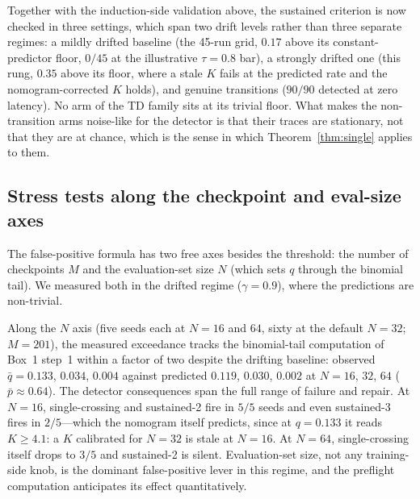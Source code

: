 \documentclass[11pt]{article}
\theoremstyle{plain}
\theoremstyle{definition}
\begin{document}
Together with the induction-side validation above, the sustained criterion is now checked
in three settings, which span two drift levels rather than three separate regimes: a
mildly drifted baseline (the 45-run grid, $0.17$ above its constant-predictor floor,
$0/45$ at the illustrative $\tau=0.8$ bar), a strongly drifted one (this rung, $0.35$
above its floor, where a stale $K$ fails at the predicted rate and the
nomogram-corrected $K$ holds), and genuine transitions ($90/90$ detected at zero
latency). No arm of the TD family sits at its trivial floor. What makes the
non-transition arms noise-like for the detector is that their traces are stationary, not
that they are at chance, which is the sense in which Theorem~\ref{thm:single} applies to
them.

\subsection{Stress tests along the checkpoint and eval-size axes}\label{sec:mnaxes}

The false-positive formula has two free axes besides the threshold: the number of
checkpoints $M$ and the evaluation-set size $N$ (which sets $q$ through the binomial
tail). We measured both in the drifted regime ($\gamma=0.9$), where the predictions are
non-trivial.

Along the $N$ axis (five seeds each at $N=16$ and $64$, sixty at the default $N=32$;
$M=201$), the measured exceedance tracks the binomial-tail computation of Box~1 step~1
within a factor of two despite the drifting baseline: observed $\bar q = 0.133$, $0.034$,
$0.004$ against predicted $0.119$, $0.030$, $0.002$ at $N=16$, $32$, $64$ ($\bar p
\approx 0.64$). The detector consequences span the full range of failure and repair. At
$N=16$, single-crossing and sustained-2 fire in $5/5$ seeds and even sustained-3 fires
in $2/5$---which the nomogram itself predicts, since at $q=0.133$ it reads $K\geq4.1$:
a $K$ calibrated for $N=32$ is stale at $N=16$. At $N=64$, single-crossing itself drops
to $3/5$ and sustained-2 is silent. Evaluation-set size, not any training-side knob, is
the dominant false-positive lever in this regime, and the preflight computation
anticipates its effect quantitatively.
\end{document}
